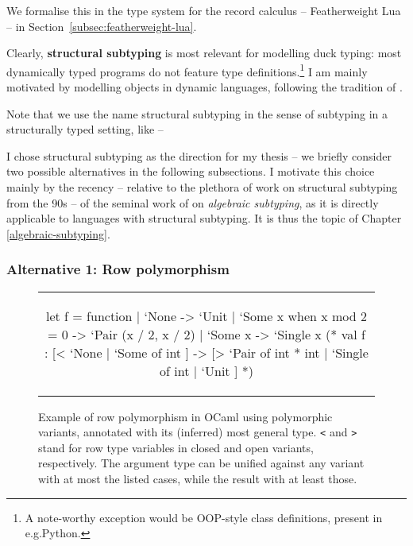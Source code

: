 We formalise this in the type system for the record calculus -- Featherweight Lua -- in Section~\ref{subsec:featherweight-lua}.

Clearly, \textbf{structural subtyping} is most relevant for modelling duck typing: most dynamically typed programs do not feature type definitions.\footnote{A note-worthy exception would be OOP-style class definitions, present in e.g.\@ Python.} I am mainly motivated by modelling objects in dynamic languages, following the tradition of \textcite{cardelli-multiple-inheritance}.

Note that we use the name structural subtyping in the sense of subtyping in a structurally typed setting, like \textcite{} -- 

I chose structural subtyping as the direction for my thesis -- we briefly consider two possible alternatives in the following subsections. I motivate this choice mainly by the recency -- relative to the plethora of work on structural subtyping from the 90s -- of the seminal work of \textcite{mlsub} on \emph{algebraic subtyping}, as it is directly applicable to languages with structural subtyping. It is thus the topic of Chapter \ref{algebraic-subtyping}.

\subsubsection{Alternative 1: Row polymorphism}

\begin{figure}
    \centering
    \begin{tabular}{c}
    \begin{ocaml}
let f = function 
    | `None -> `Unit 
    | `Some x when x mod 2 = 0 -> `Pair (x / 2, x / 2) 
    | `Some x -> `Single x
(* 
val f : [< `None | `Some of int ] 
     -> [> `Pair of int * int | `Single of int | `Unit ]
*)
    \end{ocaml}
    \end{tabular}
    \caption{Example of row polymorphism in OCaml using polymorphic variants, annotated with its (inferred) most general type. \texttt{<} and \texttt{>} stand for row type variables in closed and open variants, respectively. The argument type can be unified against any variant with at most the listed cases, while the result with at least those.}
    \label{fig:ocaml-row-polymorphism}
\end{figure}

